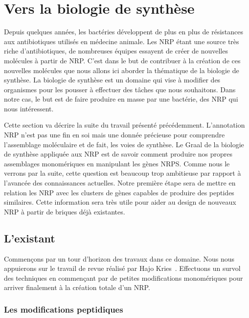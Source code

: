 \section{Vers la biologie de synthèse}

Depuis quelques années, les bactéries développent de plus en plus de résistances aux antibiotiques utilisés en médecine animale.
Les NRP étant une source très riche d'antibiotiques, de nombreuses équipes essayent de créer de nouvelles molécules à partir de NRP.
C'est dans le but de contribuer à la création de ces nouvelles molécules que nous allons ici aborder la thématique de la biologie de synthèse.
La biologie de synthèse est un domaine qui vise à modifier des organismes pour les pousser à effectuer des tâches que nous souhaitons.
Dans notre cas, le but est de faire produire en masse par une bactérie, des NRP qui nous intéressent.

Cette section va décrire la suite du travail présenté précédemment.
L'annotation NRP n'est pas une fin en soi mais une donnée précieuse pour comprendre l'assemblage moléculaire et de fait, les voies de synthèse.
Le Graal de la biologie de synthèse appliquée aux NRP est de savoir comment produire nos propres assemblages monomériques en manipulant les gènes NRPS.
Comme nous le verrons par la suite, cette question est beaucoup trop ambitieuse par rapport à l'avancée des connaissances actuelles.
Notre première étape sera de mettre en relation les NRP avec les clusters de gènes capables de produire des peptides similaires.
Cette information sera très utile pour aider au design de nouveaux NRP à partir de briques déjà existantes.


\subsection{L'existant}

Commençons par un tour d'horizon des travaux dans ce domaine.
Nous nous appuierons sur le travail de revue réalisé par Hajo Kries~\cite{kries_biosynthetic_2016}.
Effectuons un survol des techniques en commençant par de petites modifications monomériques pour arriver finalement à la création totale d'un NRP.


\subsubsection{Les modifications peptidiques}

